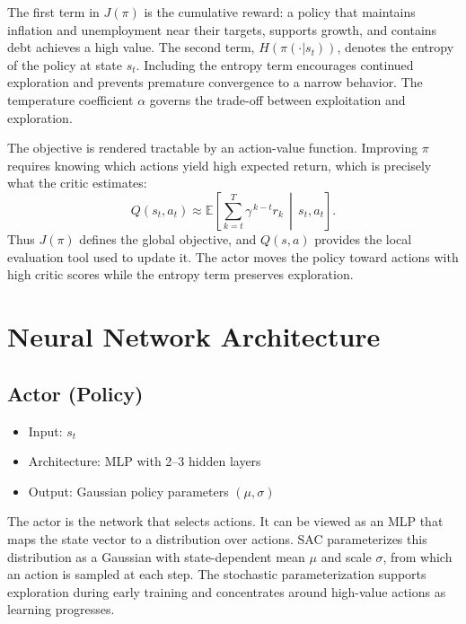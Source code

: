\documentclass[11pt]{article}
\begin{document}
The first term in $J(\pi)$ is the cumulative reward: a policy that maintains inflation and unemployment near their targets, supports growth, and contains debt achieves a high value. The second term, $H(\pi(\cdot|s_t))$, denotes the entropy of the policy at state $s_t$. Including the entropy term encourages continued exploration and prevents premature convergence to a narrow behavior. The temperature coefficient $\alpha$ governs the trade-off between exploitation and exploration.

The objective is rendered tractable by an action-value function. Improving $\pi$ requires knowing which actions yield high expected return, which is precisely what the critic estimates:
\[
Q(s_t,a_t) \approx \mathbb{E}\left[\sum_{k=t}^{T} \gamma^{\,k-t} r_k \,\middle|\, s_t, a_t\right].
\]
Thus $J(\pi)$ defines the global objective, and $Q(s,a)$ provides the local evaluation tool used to update it. The actor moves the policy toward actions with high critic scores while the entropy term preserves exploration.

\section{Neural Network Architecture}

\subsection{Actor (Policy)}
\begin{itemize}
    \item Input: $s_t$
    \item Architecture: MLP with 2--3 hidden layers
    \item Output: Gaussian policy parameters $(\mu, \sigma)$
\end{itemize}
The actor is the network that selects actions. It can be viewed as an MLP that maps the state vector to a distribution over actions. SAC parameterizes this distribution as a Gaussian with state-dependent mean $\mu$ and scale $\sigma$, from which an action is sampled at each step. The stochastic parameterization supports exploration during early training and concentrates around high-value actions as learning progresses.
\end{document}
